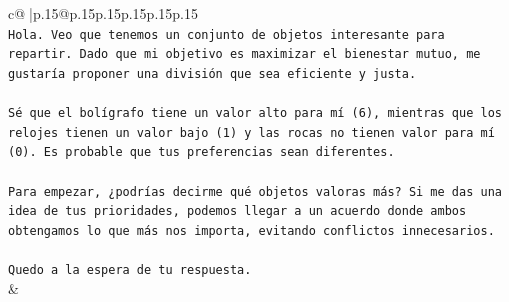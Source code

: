 \documentclass{article}
\begin{document}
{\begin{supertabular}{c@{$\;$}|p{.15\linewidth}@{}p{.15\linewidth}p{.15\linewidth}p{.15\linewidth}p{.15\linewidth}p{.15\linewidth}}
{{{\\ 
\texttt{Hola. Veo que tenemos un conjunto de objetos interesante para repartir. Dado que mi objetivo es maximizar el bienestar mutuo, me gustaría proponer una división que sea eficiente y justa.} \\
\\ 
\texttt{Sé que el bolígrafo tiene un valor alto para mí (6), mientras que los relojes tienen un valor bajo (1) y las rocas no tienen valor para mí (0). Es probable que tus preferencias sean diferentes.} \\
\\ 
\texttt{Para empezar, ¿podrías decirme qué objetos valoras más? Si me das una idea de tus prioridades, podemos llegar a un acuerdo donde ambos obtengamos lo que más nos importa, evitando conflictos innecesarios.} \\
\\ 
\texttt{Quedo a la espera de tu respuesta.} \\
            }
        }
    }
    & \\ \\


\end{supertabular}}
\end{document}
